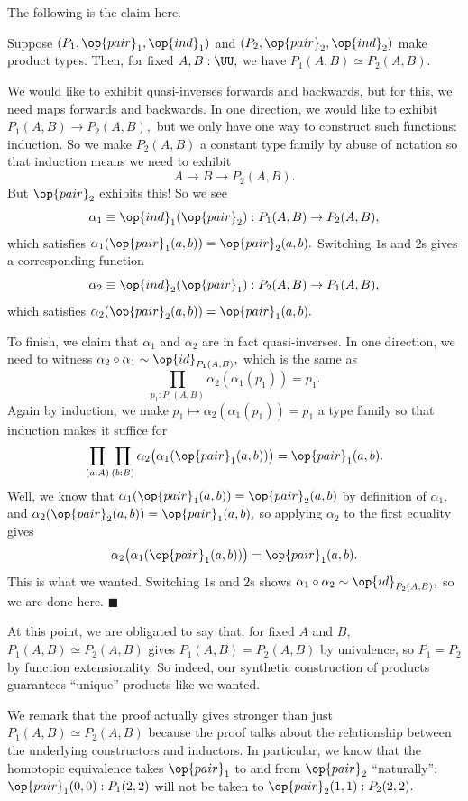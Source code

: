 The following is the claim here.
\begin{proposition}
    Suppose $(P_1,\op{pair}_1,\op{ind}_1)$ and $(P_2,\op{pair}_2,\op{ind}_2)$ make product types. Then, for fixed $A,B:\UU,$ we have $P_1(A,B)\simeq P_2(A,B).$
\end{proposition}
We would like to exhibit quasi-inverses forwards and backwards, but for this, we need maps forwards and backwards. In one direction, we would like to exhibit $P_1(A,B)\to P_2(A,B),$ but we only have one way to construct such functions: induction. So we make $P_2(A,B)$ a constant type family by abuse of notation so that induction means we need to exhibit
\[A\to B\to P_2(A,B).\]
But $\op{pair}_2$ exhibits this! So we see
\[\alpha_1\equiv\op{ind}_1(\op{pair}_2):P_1(A,B)\to P_2(A,B),\]
which satisfies $\alpha_1(\op{pair}_1(a,b))=\op{pair}_2(a,b).$ Switching $1$s and $2$s gives a corresponding function
\[\alpha_2\equiv\op{ind}_2(\op{pair}_1):P_2(A,B)\to P_1(A,B),\]
which satisfies $\alpha_2(\op{pair}_2(a,b))=\op{pair}_1(a,b).$

To finish, we claim that $\alpha_1$ and $\alpha_2$ are in fact quasi-inverses. In one direction, we need to witness $\alpha_2\circ\alpha_1\sim\op{id}_{P_1(A,B)},$ which is the same as
\[\prod_{p_1:P_1(A,B)}\alpha_2(\alpha_1(p_1))=p_1.\]
Again by induction, we make $p_1\mapsto\alpha_2(\alpha_1(p_1))=p_1$ a type family so that induction makes it suffice for
\[\prod_{(a:A)}\prod_{(b:B)}\alpha_2\big(\alpha_1(\op{pair}_1(a,b))\big)=\op{pair}_1(a,b).\]
Well, we know that $\alpha_1(\op{pair}_1(a,b))=\op{pair}_2(a,b)$ by definition of $\alpha_1,$ and $\alpha_2(\op{pair}_2(a,b))=\op{pair}_1(a,b),$ so applying $\alpha_2$ to the first equality gives
\[\alpha_2\big(\alpha_1(\op{pair}_1(a,b))\big)=\op{pair}_1(a,b).\]
This is what we wanted. Switching $1$s and $2$s shows $\alpha_1\circ\alpha_2\sim\op{id}_{P_2(A,B)},$ so we are done here. $\blacksquare$

At this point, we are obligated to say that, for fixed $A$ and $B,$ $P_1(A,B)\simeq P_2(A,B)$ gives $P_1(A,B)=P_2(A,B)$ by univalence, so $P_1=P_2$ by function extensionality. So indeed, our synthetic construction of products guarantees ``unique'' products like we wanted.

We remark that the proof actually gives stronger than just $P_1(A,B)\simeq P_2(A,B)$ because the proof talks about the relationship between the underlying constructors and inductors. In particular, we know that the homotopic equivalence takes $\op{pair}_1$ to and from $\op{pair}_2$ ``naturally'': $\op{pair}_1(0,0):P_1(2,2)$ will not be taken to $\op{pair}_2(1,1):P_2(2,2).$

